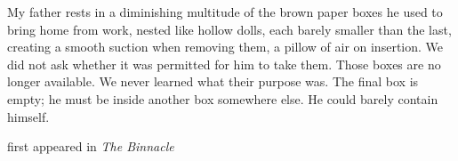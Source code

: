 My father rests in a diminishing multitude of the brown paper boxes he
used to bring home from work, nested like hollow dolls, each barely
smaller than the last, creating a smooth suction when removing them, a
pillow of air on insertion. We did not ask whether it was permitted for
him to take them. Those boxes are no longer available. We never learned
what their purpose was. The final box is empty; he must be inside
another box somewhere else. He could barely contain himself.

first appeared in \emph{The Binnacle}
